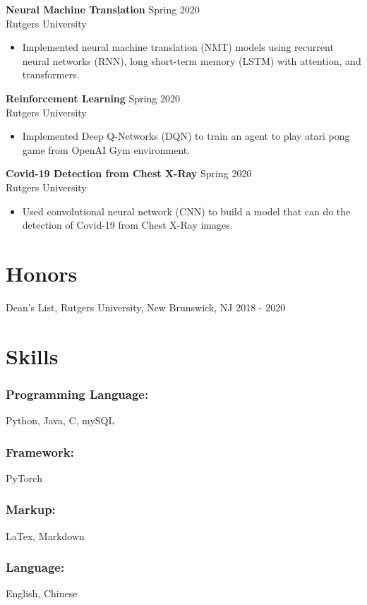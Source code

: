 \documentclass{article}
\begin{document}
\noindent \textbf{Neural Machine Translation}
\hfill{Spring 2020}\\
Rutgers University
\begin{itemize}
  \itemsep0em
  \item Implemented neural machine translation (NMT) models using recurrent neural networks (RNN), long short-term memory (LSTM) with attention, and transformers.
\end{itemize}

\noindent \textbf{Reinforcement Learning}
\hfill{Spring 2020}\\
Rutgers University
\begin{itemize}
  \itemsep0em
  \item Implemented Deep Q-Networks (DQN) to train an agent to play atari pong game from OpenAI Gym environment.
\end{itemize}

\noindent \textbf{Covid-19 Detection from Chest X-Ray}
\hfill{Spring 2020}\\
Rutgers University
\begin{itemize}
  \itemsep0em
  \item Used convolutional neural network (CNN) to build a model that can do the detection of Covid-19 from Chest X-Ray images.
\end{itemize}

\section{Honors}
Dean's List, Rutgers University, New Brunswick, NJ
\hfill{2018 - 2020}\\


\section{Skills}

\subsubsection{Programming Language:}

Python, Java, C, mySQL

\subsubsection{Framework:}

PyTorch

\subsubsection{Markup:}

LaTex, Markdown

\subsubsection{Language:}
English, Chinese
\end{document}
